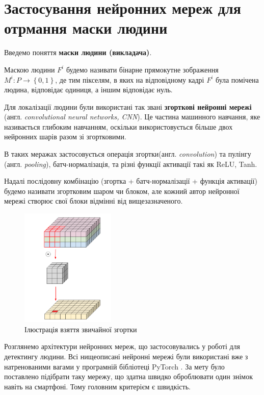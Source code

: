 \section{Застосування нейронних мереж для отрмання маски людини}

Введемо поняття \textbf{маски людини (викладача)}.

Маскою людини \(F^{i}\) будемо називати бінарне прямокутне 
зображення \(M^{i}:P \rightarrow \left\{ 0,1 \right\}\), де тим
пікселям, в яких на відповідному кадрі \(F^{i}\) була помічена людина,
відповідає одиниця, а іншим відповідає нуль.


Для локалізації людини були використані так звані \textbf{згорткові нейронні мережі} 
(англ. \textit{convolutional neural networks, CNN}).
Це частина машинного навчання, яке називається глибоким навчанням, оскільки використовується 
більше двох нейронних шарів разом зі згортковими.

В таких меражах застосовується операція згортки(англ. \textit{convolution})
та пулінгу (англ. \textit{pooling}), батч-нормалізація, та різні функції 
активації такі як ReLU, Tanh.

Надалі послідовну комбінацію (згортка + батч-нормалізації + функція активації)
будемо називати згортковим шаром чи блоком, але кожний автор нейронної мережі
створює свої блоки відмінні від вищезазначеного. 

\begin{figure}[H]
    \centering
    \includegraphics[width=0.4\textwidth]{images/cnn_conv_operation}
    \caption{Ілюстрація взяття звичайної згортки  \cite{deep_wise_sep_conv_website}
    \label{fig:cnn:deep_wise_conv}
    }
\end{figure}

Розглянемо архітектури нейронних мереж, що застосовувались у роботі
для детектингу людини. Всі нищеописані нейронні мережі були використані вже з
натренованими вагами у програмній бібліотеці PyTorch \cite{NEURIPS2019_9015}.
За мету було поставлено підібрати таку мережу, що здатна швидко оброблювати 
один знімок навіть на смартфоні. Тому головним критерієм є швидкість.

